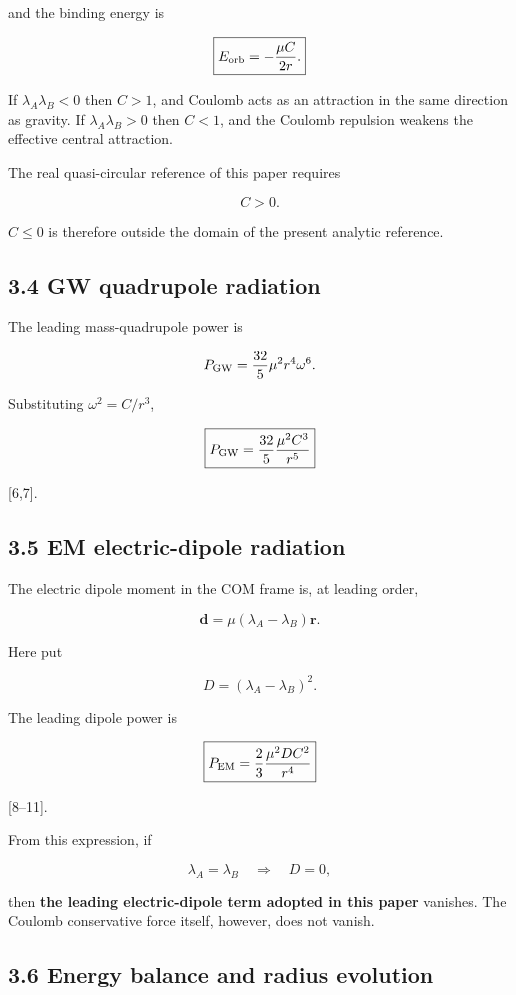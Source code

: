 \documentclass[
  a4paper,
]{article}
\begin{document}
and the binding energy is

\[
\boxed{
E_{\rm orb}=-\frac{\mu C}{2r}.
}
\]

If \(\lambda_A\lambda_B<0\) then \(C>1\), and Coulomb acts as an
attraction in the same direction as gravity. If \(\lambda_A\lambda_B>0\)
then \(C<1\), and the Coulomb repulsion weakens the effective central
attraction.

The real quasi-circular reference of this paper requires

\[
\boxed{C>0}.
\]

\(C\le0\) is therefore outside the domain of the present analytic
reference.

\subsection{3.4 GW quadrupole radiation}\label{gw-quadrupole-radiation}

The leading mass-quadrupole power is

\[
P_{\rm GW}
=
\frac{32}{5}\mu^2 r^4\omega^6.
\]

Substituting \(\omega^2=C/r^3\),

\[
\boxed{
P_{\rm GW}
=
\frac{32}{5}
\frac{\mu^2C^3}{r^5}
}
\]

{[}6,7{]}.

\subsection{3.5 EM electric-dipole
radiation}\label{em-electric-dipole-radiation}

The electric dipole moment in the COM frame is, at leading order,

\[
\mathbf d
=
\mu(\lambda_A-\lambda_B)\mathbf r.
\]

Here put

\[
\boxed{
D=(\lambda_A-\lambda_B)^2.
}
\]

The leading dipole power is

\[
\boxed{
P_{\rm EM}
=
\frac23
\frac{\mu^2 D C^2}{r^4}
}
\]

{[}8--11{]}.

From this expression, if

\[
\lambda_A=\lambda_B
\quad\Longrightarrow\quad
D=0,
\]

then \textbf{the leading electric-dipole term adopted in this paper}
vanishes. The Coulomb conservative force itself, however, does not
vanish.

\subsection{3.6 Energy balance and radius
evolution}\label{energy-balance-and-radius-evolution}
\end{document}
